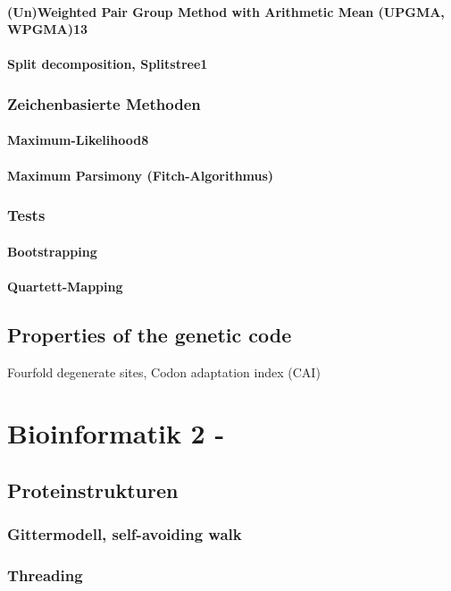\documentclass[%
   final,      %
   paper=a4,%
   paper=portrait, %
   pagesize=auto, %
   fontsize=11pt,%
 ]{scrreprt} %
\begin{document}
\subsubsection{(Un)Weighted Pair Group Method with Arithmetic Mean (UPGMA, WPGMA)13}

\subsubsection{Split decomposition, Splitstree1}
\subsection{Zeichenbasierte Methoden}
\subsubsection{Maximum-Likelihood8}
\subsubsection{Maximum Parsimony (Fitch-Algorithmus)}
\subsection{Tests}
\subsubsection{Bootstrapping}
\subsubsection{Quartett-Mapping}

\section{Properties of the genetic code}
Fourfold degenerate sites, Codon adaptation index (CAI)

\chapter{Bioinformatik 2 - }
\section{Proteinstrukturen}
\subsection{Gittermodell, self-avoiding walk}
\subsection{Threading}
\end{document}
